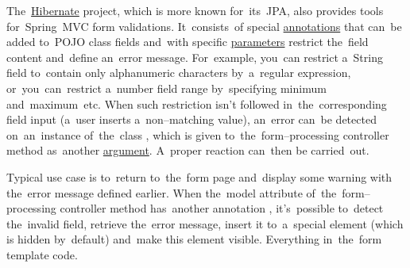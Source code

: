 The~\hyperref[hibernate]{Hibernate} project, which is more known for~its~JPA, also provides tools for~Spring~MVC form validations.
It~consists~of special \hyperref[javaannotation]{annotations} that can~be added to~POJO class fields and~with specific \hyperref[parameterargument]{parameters} restrict the~field content and~define an~error message.
For~example, you~can restrict a~String field to~contain only alphanumeric characters by~a~regular expression, or~you~can~restrict a~number field range by~specifying minimum and~maximum~etc.
When such restriction isn't followed in~the~corresponding field input (a~user inserts a~non--matching value), an~error can~be detected on~an~instance of~the~class , which is given to~the~form--processing controller method as~another \hyperref[parameterargument]{argument}.
A~proper reaction can~then be carried~out.

Typical use case is to~return to~the~form page and~display some warning with the~error message defined earlier.
When the~model attribute of~the~form--processing controller method has~another annotation , it's~possible to~detect the~invalid field, retrieve the~error message, insert it to~a~special element (which is hidden by~default) and~make this element visible.
Everything in~the~form template code.
\newpage

